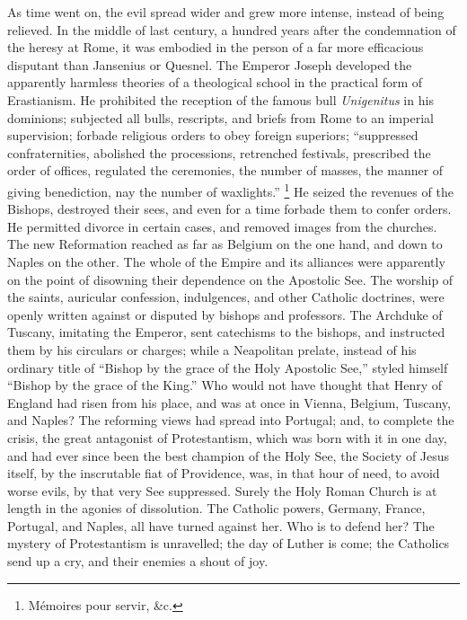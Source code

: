 As time went on, the evil spread wider and grew more intense,
instead of being relieved. In the middle of last century, a hundred
years after the condemnation of the heresy at Rome, it was embodied in
the person of a far more efficacious disputant than Jansenius or
Quesnel. The Emperor Joseph developed the apparently harmless theories
of a theological school in the practical form of Erastianism. He
prohibited the reception of the famous bull \emph{Unigenitus} in his
dominions; subjected all bulls, rescripts, and briefs from Rome to an
imperial supervision; forbade religious orders to obey foreign
superiors; ``suppressed confraternities, abolished the
processions, retrenched festivals, prescribed the order of offices,
regulated the ceremonies, the number of masses, the manner of giving
benediction, nay the number of waxlights.'' \footnote{Mémoires pour servir, \&c.} He seized the revenues of the Bishops, destroyed their sees,
and even for a time forbade them to confer orders. He permitted
divorce in certain cases, and removed images from the churches. The
new Reformation reached as far as Belgium on the one hand, and down to
Naples on the other. The whole of the Empire and its alliances were
apparently on the point of disowning their dependence on the Apostolic
See. The worship of the saints, auricular confession, indulgences, and
other Catholic doctrines, were openly written against or disputed by
bishops and professors. The Archduke of Tuscany, imitating the
Emperor, sent catechisms to the bishops, and instructed them by his
circulars or charges; while a Neapolitan prelate, instead of his
ordinary title of ``Bishop by the grace of the Holy Apostolic
See,'' styled himself ``Bishop by the grace of the King.''
Who would not have thought that Henry of England had risen from his
place, and was at once in Vienna, Belgium, Tuscany, and Naples? The
reforming views had spread into Portugal; and, to complete the crisis,
the great antagonist of Protestantism, which was born with it in one
day, and had ever since been the best champion of the Holy See, the
Society of Jesus itself, by the inscrutable fiat of Providence, was,
in that hour of need, to avoid worse evils, by that very See
suppressed. Surely the Holy Roman Church is at length in the agonies
of dissolution. The Catholic powers, Germany, France, Portugal, and
Naples, all have turned against her. Who is to defend her? The mystery
of Protestantism is unravelled; the day of Luther is come; the
Catholics send up a cry, and their enemies a shout of joy.

